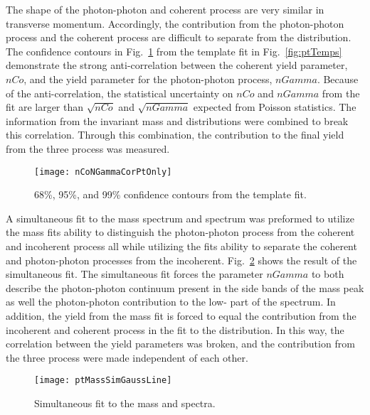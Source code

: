     The shape of the photon-photon and coherent \JPsi{} process are very 
      similar in transverse momentum.
    Accordingly, the contribution from the photon-photon process and the 
      coherent process are difficult to separate from the \pt{} distribution.
    The confidence contours in Fig.~\ref{fig:ptOnlyCor} from the template fit
      in Fig.~\ref{fig:ptTemps} demonstrate the strong anti-correlation 
      between the coherent yield parameter, $nCo$, and the yield parameter 
      for the photon-photon process, $nGamma$.
    Because of the anti-correlation, the statistical uncertainty on $nCo$ and 
      $nGamma$ from the fit are larger than $\sqrt{nCo}$ and $\sqrt{nGamma}$
      expected from Poisson statistics. 
    The information from the invariant mass and \pt{} distributions were
      combined to break this correlation. 
    Through this combination, the contribution to the final yield from 
      the three process was measured.

    \begin{figure}[!Hhbt]
      \centering
      \texttt{[image: nCoNGammaCorPtOnly]}
      \caption{68\%, 95\%, and 99\% confidence contours from the \pt{} 
        template fit. }
      \label{fig:ptOnlyCor}
    \end{figure}

    A simultaneous fit to the mass spectrum and \pt{} 
      spectrum was preformed to utilize the mass fits ability to distinguish 
      the photon-photon process from the coherent and incoherent process all 
      while utilizing the \pt{} fits ability to separate the coherent and 
      photon-photon processes from the incoherent.
    Fig.~\ref{fig:simFitMassPtGauss} shows the result of the simultaneous fit.
    The simultaneous fit forces the parameter $nGamma$ to both describe the 
      photon-photon continuum present in the side bands of the \JPsi{} mass 
      peak as well the photon-photon contribution to the low-\pt{} part of 
      the \pt{} spectrum.
    In addition, the \JPsi{} yield from the mass fit is forced to equal the
      contribution from the incoherent and coherent process in the 
      fit to the \pt{} distribution. 
    In this way, the correlation between the yield parameters was broken, and 
      the contribution from the three process were made independent of each 
      other.

    \begin{figure}[!Hhbt]
      \centering
      \texttt{[image: ptMassSimGaussLine]}
      \caption{Simultaneous fit to the mass and \pt{} spectra.}
      \label{fig:simFitMassPtGauss}
    \end{figure}

